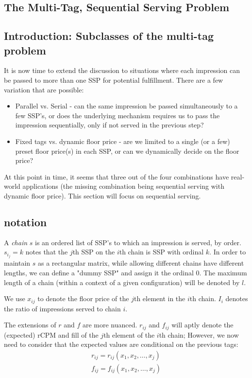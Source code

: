 \documentclass{article}
\begin{document}
\begin{large}
\section{The Multi-Tag, Sequential Serving Problem}
\subsection{Introduction: Subclasses of the multi-tag problem}
It is now time to extend the discussion to situations where each impression can be passed to more than one SSP for potential fulfillment. There are a few variation that are possible:
\begin{itemize}
\item Parallel vs. Serial - can the same impression be passed simultaneously to a few SSP's, or does the underlying mechanism requires us to pass the impression sequentially, only if not served in the previous step?
\item Fixed tags vs. dynamic floor price - are we limited to a single (or a few) preset floor price(s) in each SSP, or can we dynamically decide on the floor price?
\end{itemize}
At this point in time, it seems that three out of the four combinations have real-world applications (the missing combination being sequential serving with dynamic floor price). This section will focus on sequential serving.

\subsection{notation}
A \emph{chain} $s$ is an ordered list of SSP's to which an impression is served, by order. $s_i_j=k$ notes that the $j$th SSP on the $i$th chain is SSP with ordinal $k$. In order to maintain $s$ as a rectangular matrix, while allowing different chains  have different lengths, we can define a "dummy SSP" and assign it the ordinal 0. The maximum length of a chain (within a context of a given configuration) will be denoted by $l$. 

We use $x_{ij}$ to denote the floor price of the $j$th element in the $i$th chain. $I_i$ denotes the ratio of impressions served to chain $i$.

The extensions of $r$ and $f$ are more nuanced. $r_{ij}$ and $f_{ij}$ will aptly denote the (expected) rCPM and fill of the $j$th element of the $i$th chain; However, we now need to consider that the expected values are conditional on the previous tags:
\begin{equation*}
\begin{aligned}
r_{ij}=r_{ij}(x_1,x_2,\dots,x_j)\\
f_{ij}=f_{ij}(x_1,x_2,\dots,x_j)
\end{aligned}
\end{equation*}


\end{large}
\end{document}
